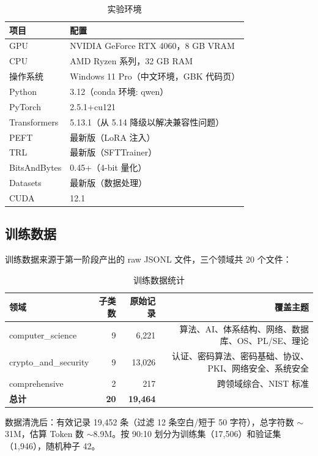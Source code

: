 \documentclass[12pt,a4paper]{ctexart}
\begin{document}
\begin{table}[htbp]\centering
\caption{实验环境}
\begin{tabular}{@{}ll@{}}
\toprule
\textbf{项目} & \textbf{配置} \\
\midrule
GPU        & NVIDIA GeForce RTX 4060，8 GB VRAM \\
CPU        & AMD Ryzen 系列，32 GB RAM \\
操作系统   & Windows 11 Pro（中文环境，GBK 代码页）\\
Python     & 3.12（conda 环境: qwen）\\
PyTorch    & 2.5.1+cu121 \\
Transformers & 5.13.1（从 5.14 降级以解决兼容性问题）\\
PEFT       & 最新版（LoRA 注入）\\
TRL        & 最新版（SFTTrainer）\\
BitsAndBytes & 0.45+（4-bit 量化）\\
Datasets   & 最新版（数据处理）\\
CUDA       & 12.1 \\
\bottomrule
\end{tabular}
\end{table}

\subsection{训练数据}

训练数据来源于第一阶段产出的 raw JSONL 文件，三个领域共 20 个文件：

\begin{table}[htbp]\centering
\caption{训练数据统计}
\begin{tabular}{@{}lrrr@{}}
\toprule
\textbf{领域} & \textbf{子类数} & \textbf{原始记录} & \textbf{覆盖主题} \\
\midrule
computer\_science   & 9 & 6,221 & 算法、AI、体系结构、网络、数据库、OS、PL/SE、理论 \\
crypto\_and\_security & 9 & 13,026 & 认证、密码算法、密码基础、协议、PKI、网络安全、系统安全 \\
comprehensive       & 2 & 217   & 跨领域综合、NIST 标准 \\
\midrule
\textbf{总计}       & \textbf{20} & \textbf{19,464} & \\
\bottomrule
\end{tabular}
\end{table}

数据清洗后：有效记录 19,452 条（过滤 12 条空白/短于 50 字符），总字符数 $\sim$31M，估算 Token 数 $\sim$8.9M。按 90:10 划分为训练集（17,506）和验证集（1,946），随机种子 42。
\end{document}
